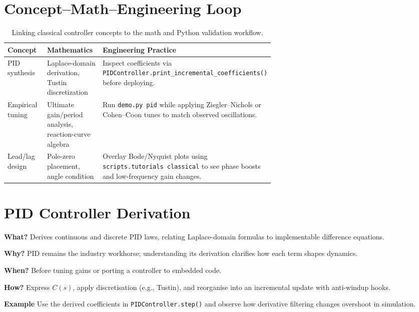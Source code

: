 \section{Concept--Math--Engineering Loop}
\begin{table}[h]
    \centering
    \small
    \renewcommand{\arraystretch}{1.2}
    \begin{tabularx}{\linewidth}{|>{\raggedright\arraybackslash}p{0.28\linewidth}|>{\raggedright\arraybackslash}p{0.34\linewidth}|>{\raggedright\arraybackslash}X|}
        \hline
        \textbf{Concept} & \textbf{Mathematics} & \textbf{Engineering Practice} \\
        \hline
        PID synthesis & Laplace-domain derivation, Tustin discretization & Inspect coefficients via \texttt{PIDController.print\_incremental\_coefficients()} before deploying. \\
        \hline
        Empirical tuning & Ultimate gain/period analysis, reaction-curve algebra & Run \texttt{demo.py pid} while applying Ziegler--Nichols or Cohen--Coon tunes to match observed oscillations. \\
        \hline
        Lead/lag design & Pole-zero placement, angle condition & Overlay Bode/Nyquist plots using \texttt{scripts.tutorials classical} to see phase boosts and low-frequency gain changes. \\
        \hline
    \end{tabularx}
    \caption{Linking classical controller concepts to the math and Python validation workflow.}
\end{table}

\section{PID Controller Derivation}
\begin{beginnerguide}
    \item[\textbf{What?}] Derives continuous and discrete PID laws, relating Laplace-domain formulas to implementable difference equations.
    \item[\textbf{Why?}] PID remains the industry workhorse; understanding its derivation clarifies how each term shapes dynamics.
    \item[\textbf{When?}] Before tuning gains or porting a controller to embedded code.
    \item[\textbf{How?}] Express $C(s)$, apply discretisation (e.g., Tustin), and reorganise into an incremental update with anti-windup hooks.
    \item[\textbf{Example}] Use the derived coefficients in \texttt{PIDController.step()} and observe how derivative filtering changes overshoot in simulation.
\end{beginnerguide}
